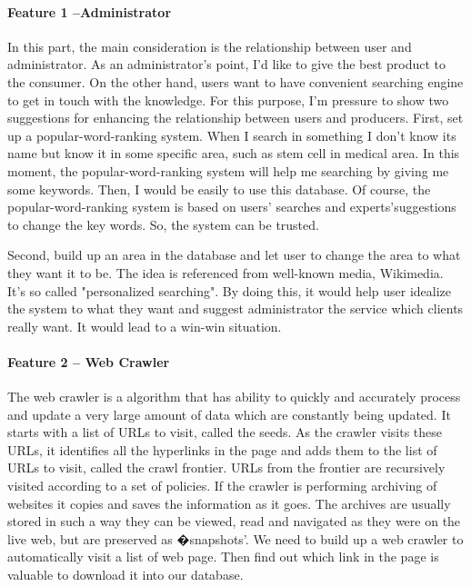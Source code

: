 \documentclass[a4paper]{article} %
\begin{document}
	\paragraph*{Feature 1 --Administrator}
	\label{task1:part1}
	
	In this part, the main consideration is the relationship between user and administrator. As an administrator's point, I'd like to give the best product to the consumer. On the other hand, users want to have convenient searching engine to get in touch with the knowledge. For this purpose, I'm pressure to show two suggestions for enhancing the relationship between users and producers. First, set up a popular-word-ranking system. When I search in something I don't know its name but know it in some specific area, such as stem cell in medical area. In this moment, the popular-word-ranking system will help me searching by giving me some keywords. Then, I would be easily to use this database. Of course, the popular-word-ranking system is based on users' searches and experts'suggestions to change the key words. So, the system can be trusted. 
	
	Second, build up an area in the database and let user to change the area to what they want it to be. The idea is referenced from well-known media, Wikimedia. It's so called "personalized searching". By doing this, it would help user idealize the system to what they want and suggest administrator the service which clients really want. It would lead to a win-win situation.
	
	\paragraph*{Feature 2 -- Web Crawler}
	\label{task1:feature2}
	
	The web crawler is a algorithm that has ability to quickly and accurately process and update a very large amount of data which are constantly being updated.\cite{Liu2012} It starts with a list of URLs to visit, called the seeds. As the crawler visits these URLs, it identifies all the hyperlinks in the page and adds them to the list of URLs to visit, called the crawl frontier. URLs from the frontier are recursively visited according to a set of policies. If the crawler is performing archiving of websites it copies and saves the information as it goes. The archives are usually stored in such a way they can be viewed, read and navigated as they were on the live web, but are preserved as �snapshots'.\cite{Du2013} We need to build up a web crawler to automatically visit a list of web page. Then find out which link in the page is valuable to download it into our database. 
	
\end{document}
